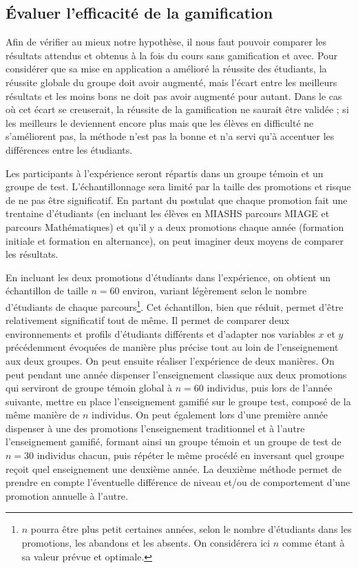 \subsection{Évaluer l'efficacité de la gamification}
Afin de vérifier au mieux notre hypothèse, il nous faut pouvoir comparer les résultats attendus et obtenus à la fois du cours sans gamification et avec. Pour considérer que sa mise en application a amélioré la réussite des étudiants, la réussite globale du groupe doit avoir augmenté, mais l'écart entre les meilleurs résultats et les moins bons ne doit pas avoir augmenté pour autant. Dans le cas où cet écart se creuserait, la réussite de la gamification ne saurait être validée ; si les meilleurs le deviennent encore plus mais que les élèves en difficulté ne s'améliorent pas, la méthode n'est pas la bonne et n'a servi qu'à accentuer les différences entre les étudiants. \par

Les participants à l'expérience seront répartis dans un groupe témoin et un groupe de test. L'échantillonnage sera limité par la taille des promotions et risque de ne pas être significatif. En partant du postulat que chaque promotion fait une trentaine d'étudiants (en incluant les élèves en MIASHS parcours MIAGE et parcours Mathématiques) et qu'il y a deux promotions chaque année (formation initiale et formation en alternance), on peut imaginer deux moyens de comparer les résultats. \par

En incluant les deux promotions d'étudiants dans l'expérience, on obtient un échantillon de taille $n = 60$ environ, variant légèrement selon le nombre d'étudiants de chaque parcours\footnote{$n$ pourra être plus petit certaines années, selon le nombre d'étudiants dans les promotions, les abandons et les absents. On considérera ici $n$ comme étant à sa valeur prévue et optimale.}. Cet échantillon, bien que réduit, permet d'être relativement significatif tout de même. Il permet de comparer deux environnements et profils d'étudiants différents et d'adapter nos variables $x$ et $y$ précédemment évoquées de manière plus précise tout au loin de l'enseignement aux deux groupes. On peut ensuite réaliser l'expérience de deux manières. On peut pendant une année dispenser l'enseignement classique aux deux promotions qui serviront de groupe témoin global à $n = 60$ individus, puis lors de l'année suivante, mettre en place l'enseignement gamifié sur le groupe test, composé de la même manière de $n$ individus. On peut également lors d'une première année dispenser à une des promotions l'enseignement traditionnel et à l'autre l'enseignement gamifié, formant ainsi un groupe témoin et un groupe de test de $n = 30$ individus chacun, puis répéter le même procédé en inversant quel groupe reçoit quel enseignement une deuxième année. La deuxième méthode permet de prendre en compte l'éventuelle différence de niveau et/ou de comportement d'une promotion annuelle à l'autre. \par